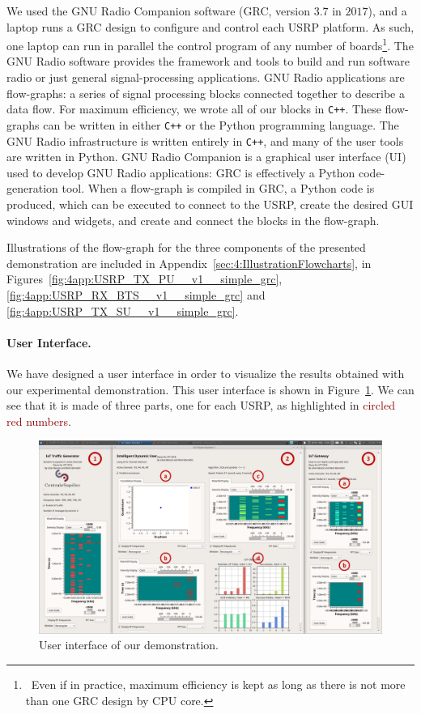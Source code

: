 We used the GNU Radio Companion software (GRC, version $3.7$ in $2017$),
and a laptop runs a GRC design to configure and control each USRP platform.
As such, one laptop can run in parallel the control program of any number of boards\footnote{~Even if in practice, maximum efficiency is kept as long as there is not more than one GRC design by CPU core.}.
%
The GNU Radio software provides the framework and tools to build and run software radio or just general signal-processing applications.
GNU Radio applications are flow-graphs: a series of signal processing blocks connected together to describe a data flow.
For maximum efficiency, we wrote all of our blocks in \texttt{C++}.
These flow-graphs can be written in either \texttt{C++} or the Python programming language. The GNU Radio infrastructure is written entirely in \texttt{C++}, and many of the user tools are written in Python.
GNU Radio Companion is a graphical user interface (UI) used to develop GNU Radio applications:
GRC is effectively a Python code-generation tool.
When a flow-graph is compiled in GRC, a Python code is produced, which can be executed to connect to the USRP,
create the desired GUI windows and widgets, and create and connect the blocks in the flow-graph.

Illustrations of the flow-graph for the three components of the presented demonstration are included in Appendix~\ref{sec:4:IllustrationFlowcharts}, in Figures~\ref{fig:4app:USRP_TX_PU__v1__simple_grc}, \ref{fig:4app:USRP_RX_BTS__v1__simple_grc} and \ref{fig:4app:USRP_TX_SU__v1__simple_grc}.


\paragraph{User Interface.}

We have designed a user interface in order to visualize the results obtained  with our experimental demonstration. This user interface is shown in Figure~\ref{fig:42:UI}.
We can see that it is made of three parts, one for each USRP, as highlighted in \textcolor{darkred}{circled red numbers}.

\begin{figure}[!h]
    \centering
    \includegraphics[width=1.00\textwidth]{UI.eps}
    \caption{User interface of our demonstration.}
    \label{fig:42:UI}
\end{figure}


